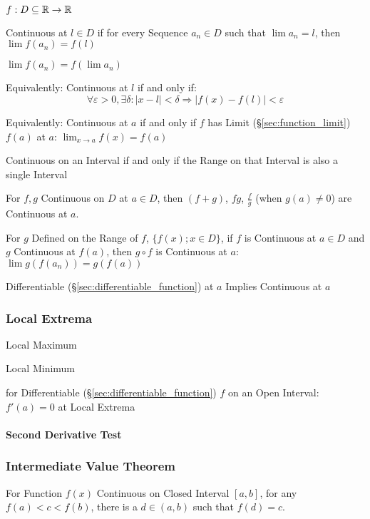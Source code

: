 $f : D \subseteq \mathbb{R} \rightarrow \mathbb{R}$

Continuous at $l \in D$ if for every Sequence $a_n \in D$ such that
$\lim a_n = l$, then $\lim f(a_n) = f(l)$

$\lim f (a_n) = f (\lim a_n)$

Equivalently: Continuous at $l$ if and only if:
\[
  \forall \varepsilon > 0, \exists \delta :
  |x - l| < \delta \Rightarrow |f(x) - f(l)| < \varepsilon
\]

Equivalently: Continuous at $a$ if and only if $f$ has Limit
(\S\ref{sec:function_limit}) $f(a)$ at $a$: $\lim_{x \rightarrow
  a}f(x) = f(a)$

Continuous on an Interval if and only if the Range on that Interval is
also a single Interval

For $f,g$ Continuous on $D$ at $a \in D$, then $(f + g)$, $f g$,
$\frac{f}{g}$ (when $g(a) \neq 0$) are Continuous at $a$.

For $g$ Defined on the Range of $f$, $\{ f(x); x \in D\}$, if $f$ is
Continuous at $a \in D$ and $g$ Continuous at $f(a)$, then $g \circ f$
is Continuous at $a$: $\lim g(f(a_n)) = g(f(a))$

Differentiable (\S\ref{sec:differentiable_function}) at $a$ Implies
Continuous at $a$



\subsubsection{Local Extrema}\label{sec:local_extrema}

Local Maximum

Local Minimum

for Differentiable (\S\ref{sec:differentiable_function}) $f$ on an
Open Interval: $f'(a) = 0$ at Local Extrema



\paragraph{Second Derivative Test}\label{sec:second_derivative_test}\hfill



\subsubsection{Intermediate Value Theorem}
\label{sec:intermediate_value}

For Function $f(x)$ Continuous on Closed Interval $[a,b]$, for any
$f(a) < c < f(b)$, there is a $d \in (a,b)$ such that $f(d) = c$.



